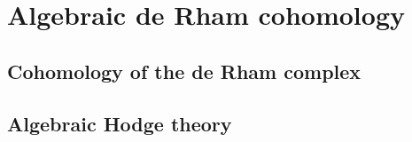 \section{Algebraic de Rham cohomology}
    \subsection{Cohomology of the de Rham complex}
        
    \subsection{Algebraic Hodge theory}